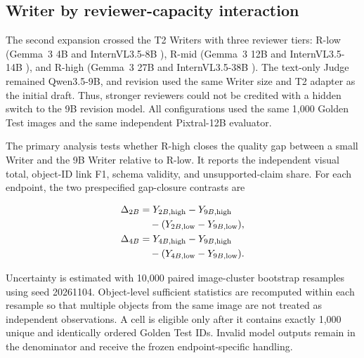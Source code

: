 \subsection{Writer by reviewer-capacity interaction}

The second expansion crossed the T2 Writers with three reviewer tiers:
R-low (Gemma~3 4B \Rc{} and InternVL3.5-8B \Rd{}), R-mid (Gemma~3 12B
\Rc{} and InternVL3.5-14B \Rd{}), and R-high (Gemma~3 27B \Rc{} and
InternVL3.5-38B \Rd{}). The text-only Judge remained Qwen3.5-9B, and revision
used the same Writer size and T2 adapter as the initial draft. Thus, stronger
reviewers could not be credited with a hidden switch to the 9B revision model.
All configurations used the same 1,000 Golden Test images and the same
independent Pixtral-12B evaluator.

The primary analysis tests whether R-high closes the quality gap between a
small Writer and the 9B Writer relative to R-low. It reports the independent
visual total, object-ID link F1, schema validity, and unsupported-claim share.
For each endpoint, the two prespecified gap-closure contrasts are

\begin{align}
\Delta_{2B} &= Y_{2B,\mathrm{high}}-Y_{9B,\mathrm{high}} \notag\\
             &\quad -(Y_{2B,\mathrm{low}}-Y_{9B,\mathrm{low}}),\\
\Delta_{4B} &= Y_{4B,\mathrm{high}}-Y_{9B,\mathrm{high}} \notag\\
             &\quad -(Y_{4B,\mathrm{low}}-Y_{9B,\mathrm{low}}).
\end{align}

Uncertainty is estimated with 10,000 paired image-cluster bootstrap resamples
using seed 20261104. Object-level sufficient statistics are recomputed within
each resample so that multiple objects from the same image are not treated as
independent observations. A cell is eligible only after it contains exactly
1,000 unique and identically ordered Golden Test IDs. Invalid model outputs
remain in the denominator and receive the frozen endpoint-specific handling.


